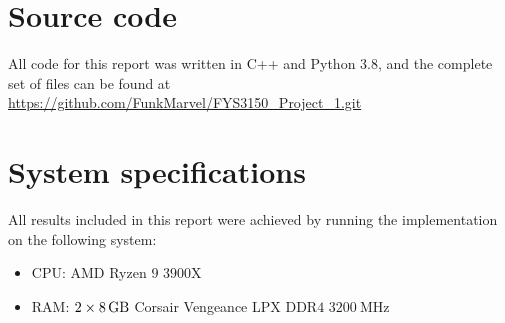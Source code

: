 \documentclass[english,notitlepage,reprint,nofootinbib]{revtex4-1}  %
\begin{document}
{}

\appendix
\section{Source code} \label{A}
All code for this report was written in C++ and Python 3.8, and the complete set of files can be found at \url{https://github.com/FunkMarvel/FYS3150_Project_1.git}

\section{System specifications} \label{B}
All results included in this report were achieved by running the implementation on the following system:
\begin{itemize}
	\item CPU: AMD Ryzen \(9\) \(3900\)X
	\item RAM: \(2\times\SI{8}{\giga\byte}\) Corsair Vengeance LPX DDR\(4\) \(\SI{3200}{\mega\hertz}\)
\end{itemize}
\end{document}
